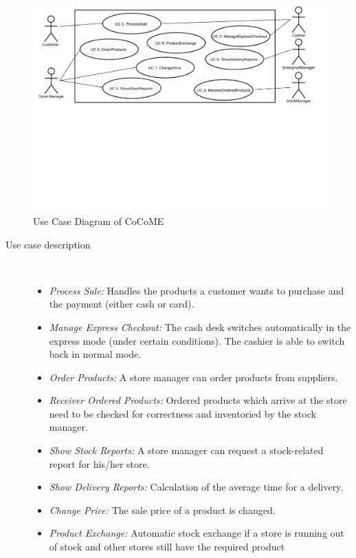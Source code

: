 \begin{figure}[h!]
	\includegraphics[width=\textwidth, trim={0 11cm 0 0}]{img/useCase.pdf}
	\caption{Use Case Diagram of CoCoME}
	\label{fig:useCases}
\end{figure}


\begin{description}


 \item[Use case description]~\par
\begin{itemize}
	\item \textit{Process Sale:} Handles the products a customer wants to purchase and the payment (either cash or card).

    \item \textit{Manage Express Checkout:} The cash desk switches automatically in the express mode (under certain conditions). The cashier is able to switch back in normal mode.
    \item \textit{Order Products:} A store manager can order products from suppliers.
    \item \textit{Receiver Ordered Products:} Ordered products which arrive at the store need to be checked for correctness and inventoried by the stock manager.
    \item \textit{Show Stock Reports:} A store manager can request a stock-related report for his/her store.
    \item \textit{Show Delivery Reports:} Calculation of the average time for a delivery.
    \item \textit{Change Price:} The sale price of a product is changed.
    \item \textit{Product Exchange:} Automatic stock exchange if a store is running out of stock and other stores still have the required product
\end{itemize}


\end{description}